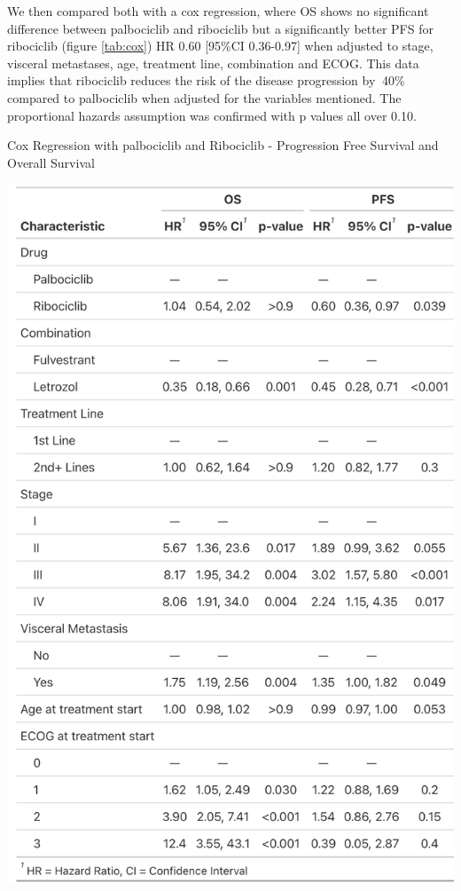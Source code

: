 We then compared both with a cox regression, where OS shows no significant difference between palbociclib and ribociclib but a significantly better PFS for ribociclib (figure \ref*{tab:cox}) HR 0.60 [95\%CI 0.36-0.97] when adjusted to stage, visceral metastases, age, treatment line, combination and ECOG. This data implies that ribociclib reduces the risk of the disease progression by $~$40\% compared to palbociclib when adjusted for the variables mentioned. The proportional hazards assumption was confirmed with p values all over 0.10.
\begin{table}[ht]
  \centering
  \caption{Cox Regression with palbociclib and Ribociclib - Progression Free Survival and Overall Survival}\label{tab:cox} 
  \includegraphics[scale=0.20]{figures/cox_both.png}%

\end{table}

